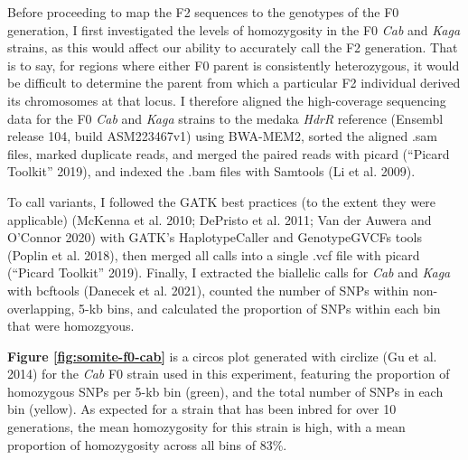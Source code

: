 \documentclass[
]{book}
\begin{document}
Before proceeding to map the F2 sequences to the genotypes of the F0 generation, I first investigated the levels of homozygosity in the F0 \emph{Cab} and \emph{Kaga} strains, as this would affect our ability to accurately call the F2 generation. That is to say, for regions where either F0 parent is consistently heterozygous, it would be difficult to determine the parent from which a particular F2 individual derived its chromosomes at that locus. I therefore aligned the high-coverage sequencing data for the F0 \emph{Cab} and \emph{Kaga} strains to the medaka \emph{HdrR} reference (Ensembl release 104, build ASM223467v1) using BWA-MEM2, sorted the aligned .sam files, marked duplicate reads, and merged the paired reads with picard ({``Picard Toolkit''} 2019), and indexed the .bam files with Samtools (Li et al. 2009).

To call variants, I followed the GATK best practices (to the extent they were applicable) (McKenna et al. 2010; DePristo et al. 2011; Van der Auwera and O'Connor 2020) with GATK's HaplotypeCaller and GenotypeGVCFs tools (Poplin et al. 2018), then merged all calls into a single .vcf file with picard ({``Picard Toolkit''} 2019). Finally, I extracted the biallelic calls for \emph{Cab} and \emph{Kaga} with bcftools (Danecek et al. 2021), counted the number of SNPs within non-overlapping, 5-kb bins, and calculated the proportion of SNPs within each bin that were homozgyous.

\textbf{Figure \ref{fig:somite-f0-cab}} is a circos plot generated with circlize (Gu et al. 2014) for the \emph{Cab} F0 strain used in this experiment, featuring the proportion of homozygous SNPs per 5-kb bin (green), and the total number of SNPs in each bin (yellow). As expected for a strain that has been inbred for over 10 generations, the mean homozygosity for this strain is high, with a mean proportion of homozygosity across all bins of 83\%.
\end{document}
